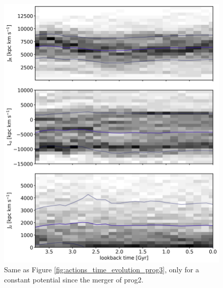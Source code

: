 \iffalse
\begin{figure}
\captionsetup{format=plain}
    \centering
	\includegraphics[width=\textwidth]{plots/Dynamics/mean_pot/action_time_evolution_hist_mean_prog3.png}
    \caption{Same as Figure \ref{fig:actions_time_evolution_prog3}, only for a constant potential since the merger of prog2.}\label{fig:actions_time_evolution_mean_pot_prog3}
\end{figure}

